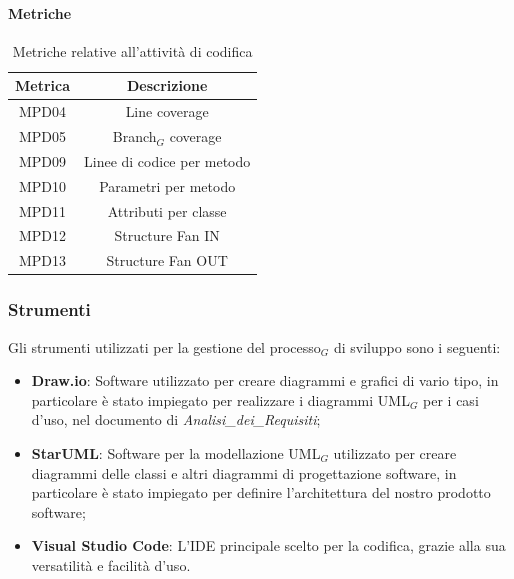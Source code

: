 \documentclass[10pt]{article}
\begin{document}
\begin{justify}
        \paragraph{Metriche}
        \begin{table}[H]
          \centering
          \begin{tabular}{|c|c|}
            \hline
            \textbf{Metrica} & \textbf{Descrizione} \\
            \hline
            MPD04 & Line coverage\\
            \hline
            MPD05 & Branch$_G$ coverage\\
            \hline
            MPD09 & Linee di codice per metodo\\
            \hline
            MPD10 & Parametri per metodo\\
            \hline
            MPD11 & Attributi per classe\\
            \hline
            MPD12 & Structure Fan IN\\
            \hline
            MPD13 & Structure Fan OUT\\
            \hline
          \end{tabular}
          \caption{Metriche relative all'attività di codifica}
        \end{table}

    \subsubsection{Strumenti}
    Gli strumenti utilizzati per la gestione del processo$_G$ di sviluppo sono i seguenti:
    \begin{itemize}
        \item \textbf{Draw.io}: Software utilizzato per creare diagrammi e grafici di vario tipo, in particolare è stato impiegato per realizzare i diagrammi UML$_G$ per i casi d'uso, nel documento di \textit{Analisi\_dei\_Requisiti};
        \item \textbf{StarUML}: Software per la modellazione UML$_G$ utilizzato per creare diagrammi delle classi e altri diagrammi di progettazione software, in particolare è stato impiegato per definire l'architettura del nostro prodotto software;
        \item \textbf{Visual Studio Code}: L'IDE principale scelto per la codifica, grazie alla sua versatilità e facilità d'uso.
    \end{itemize}


\end{justify}
\end{document}
